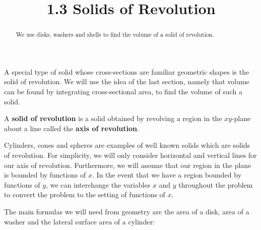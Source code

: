 \documentclass[handout]{ximera}
\title{1.3 Solids of Revolution}
\begin{document}
\begin{abstract}
We use disks, washers and shells to find the volume of a solid of revolution.
\end{abstract}

\maketitle

A special type of solid whose cross-sections are familiar geometric shapes is the solid of revolution. 
We will use the idea of the last section, namely that volume can be found by integrating cross-sectional area, 
to find the volume of such a solid.  

\begin{definition} A \textbf{solid of revolution} is a solid obtained by revolving a region in the
 $xy$-plane about a line called the \textbf{axis of revolution}.
\end{definition}

Cylinders, cones and spheres are examples of well known solids which are solids of revolution. 
For simplicity, we will only consider horizontal and vertical lines for our axis of revolution.  
Furthermore, we will assume that our region in the plane is bounded by functions of $x$.  
In the event that we have a region bounded by functions of $y$, we can interchange the 
variables $x$ and $y$ throughout the problem to convert the problem to the setting of functions of $x$.

The main formulas we will need from geometry are the area of a disk, area of a washer and 
the lateral surface area of a cylinder:
\end{document}
